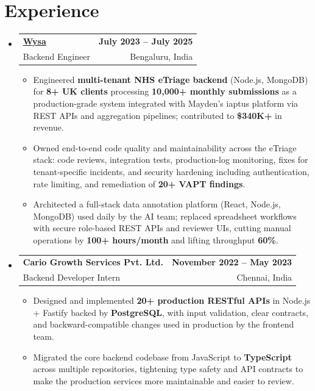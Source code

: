 \documentclass[letterpaper,10pt]{article}
\makeatletter
\newcommand{\resumeItem}[1]{
  \item\small{#1\vspace{-1pt}}
}
\newcommand{\resumeSubheading}[4]{
  \vspace{1pt}\item
    \begin{tabular*}{0.985\textwidth}[t]{l@{\extracolsep{\fill}}r}
      \textbf{#1} & \textbf{\small #2} \\
      {\small\color{ResumeSlate} #3} & {\small\color{ResumeSlate} #4} \\
    \end{tabular*}\vspace{-6pt}
}
\newcommand{\resumeSubHeadingListStart}{\begin{itemize}[leftmargin=0.0in, label={}, itemsep=2pt, topsep=2pt]}
\newcommand{\resumeSubHeadingListEnd}{\end{itemize}}
\newcommand{\resumeItemListStart}{\begin{itemize}[leftmargin=0.18in, itemsep=2pt, topsep=1pt]}
\newcommand{\resumeItemListEnd}{\end{itemize}\vspace{-4pt}}
\makeatother
\begin{document}
\section{Experience}
\resumeSubHeadingListStart
  \resumeSubheading
    {\href{https://www.wysa.io}{Wysa}}{July 2023 -- July 2025}
    {Backend Engineer}{Bengaluru, India}
    \resumeItemListStart
      \resumeItem{Engineered \textbf{multi-tenant NHS eTriage backend} (Node.js, MongoDB) for \textbf{8+ UK clients} processing \textbf{10{,}000+ monthly submissions} as a production-grade system integrated with Mayden's iaptus platform via REST APIs and aggregation pipelines; contributed to \textbf{\$340K+} in revenue.}
      \resumeItem{Owned end-to-end code quality and maintainability across the eTriage stack: code reviews, integration tests, production-log monitoring, fixes for tenant-specific incidents, and security hardening including authentication, rate limiting, and remediation of \textbf{20+ VAPT findings}.}
      \resumeItem{Architected a full-stack data annotation platform (React, Node.js, MongoDB) used daily by the AI team; replaced spreadsheet workflows with secure role-based REST APIs and reviewer UIs, cutting manual operations by \textbf{100+ hours/month} and lifting throughput \textbf{60\%}.}
    \resumeItemListEnd
  \resumeSubheading
    {Cario Growth Services Pvt. Ltd.}{November 2022 -- May 2023}
    {Backend Developer Intern}{Chennai, India}
    \resumeItemListStart
      \resumeItem{Designed and implemented \textbf{20+ production RESTful APIs} in Node.js + Fastify backed by \textbf{PostgreSQL}, with input validation, clear contracts, and backward-compatible changes used in production by the frontend team.}
      \resumeItem{Migrated the core backend codebase from JavaScript to \textbf{TypeScript} across multiple repositories, tightening type safety and API contracts to make the production services more maintainable and easier to review.}
    \resumeItemListEnd
\resumeSubHeadingListEnd
\vspace{-4pt}
\end{document}
